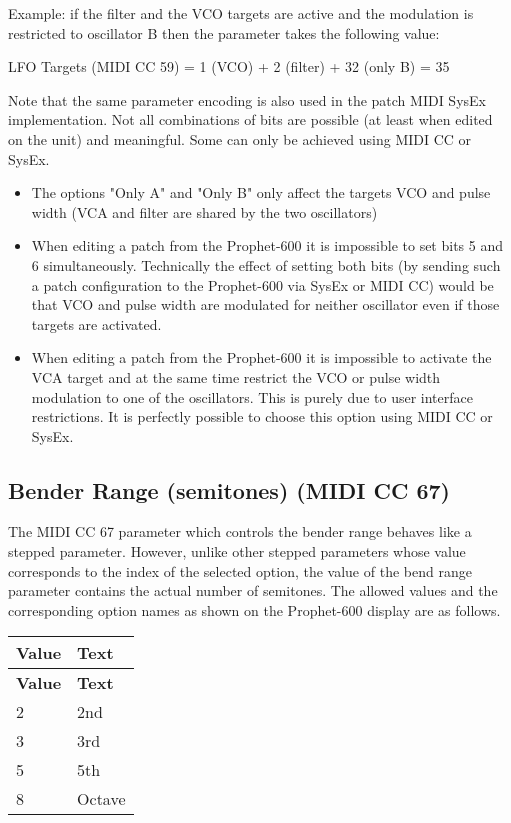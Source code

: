 Example: if the filter and the VCO targets are active and the modulation is restricted to oscillator B then the parameter takes the following value:

LFO Targets (MIDI CC 59) = 1 (VCO) + 2 (filter) + 32 (only B) = 35

Note that the same parameter encoding is also used in the patch MIDI SysEx implementation. Not all combinations of bits are possible (at least when edited on the unit) and meaningful. Some can only be achieved using MIDI CC or SysEx.
\begin{itemize}
  \item The options "Only A" and "Only B" only affect the targets VCO and pulse width (VCA and filter are shared by the two oscillators)
  \item When editing a patch from the Prophet-600 it is impossible to set bits 5 and 6 simultaneously. Technically the effect of setting both bits (by sending such a patch configuration to the Prophet-600 via SysEx or MIDI CC) would be that VCO and pulse width are modulated for neither oscillator even if those targets are activated. 
  \item When editing a patch from the Prophet-600 it is impossible to activate the VCA target and at the same time restrict the VCO or pulse width modulation to one of the oscillators. This is purely due to user interface restrictions. It is perfectly possible to choose this option using MIDI CC or SysEx. 
\end{itemize}


\subsection*{Bender Range (semitones) (MIDI CC 67)}\label{bendsemi}

The MIDI CC 67 parameter which controls the bender range behaves like a stepped parameter. However, unlike other stepped parameters whose value corresponds to the index of the selected option, the value of the bend range parameter contains the actual number of semitones. The allowed values and the corresponding option names as shown on the Prophet-600 display are as follows. 

\renewcommand{\arraystretch}{1.3}

\begin{longtable}[l]{p{1.2cm}|p{4cm}} 
\textbf{Value} & \textbf{Text} \\ \hline
\endfirsthead
\textbf{Value} & \textbf{Text} \\ \hline
\endhead 
2 & 2nd \\ \hline 
3 & 3rd \\ \hline 
5 & 5th \\ \hline 
8 & Octave \\ \hline 
\end{longtable}

